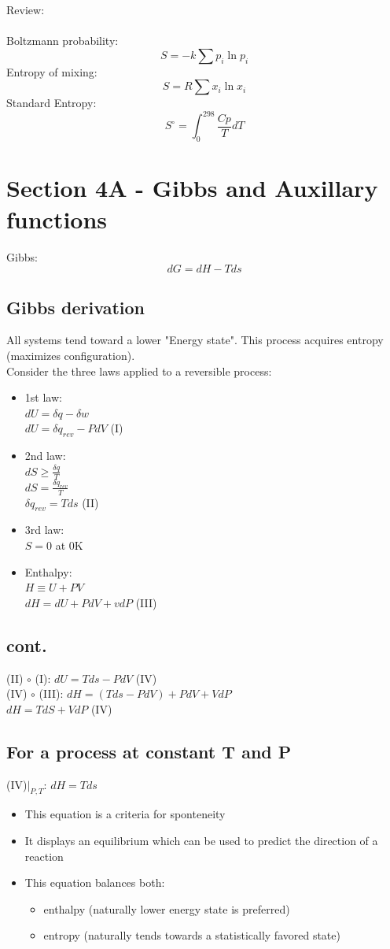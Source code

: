 \documentclass[10pt]{article}
\begin{document}
Review:
\\~\\
Boltzmann probability: $$S = -k \sum p_i \ln p_i$$
Entropy of mixing: $$S = R \sum x_i \ln x_i$$
Standard Entropy: $$S^\circ = \int_{0}^{298}\frac{Cp}{T}dT$$ 

\section{Section 4A - Gibbs and Auxillary functions}
Gibbs: $$dG = dH - Tds$$
\subsection{Gibbs derivation}
All systems tend toward a lower "Energy state". This process acquires entropy (maximizes configuration).
\\
Consider the three laws applied to a reversible process:
\begin{itemize}
    \item 1st law: 
    \\$dU = \delta q - \delta w$ 
    \\ $dU = \delta q_{rev} - PdV$ (I)
    \item 2nd law: 
    \\$dS \ge \frac{\delta q}{T}$
    \\$dS = \frac{\delta q_{rev}}{T}$
    \\$\delta q_{rev} = T ds$ (II)
    \item 3rd law:
    \\$S = 0$ at 0K
    \item Enthalpy:
    \\ $H \equiv U + PV$
    \\$dH = dU + PdV + vdP$ (III)
\end{itemize}
\subsection{cont.}
(II) $\circ$ (I): $dU = Tds - PdV$ (IV)
\\
(IV) $\circ$ (III): $dH = (Tds - PdV) + PdV + VdP$
\\$dH = TdS + VdP$ (IV)

\subsection{For a process at constant T and P}
(IV)$\Big|_{P,T}$: $dH = Tds$
\\
\begin{itemize}
    \item This equation is a criteria for sponteneity
    \item It displays an equilibrium which can be used to predict the direction of a reaction
    \item This equation balances both:
    \begin{itemize}
        \item enthalpy (naturally lower energy state is preferred)
        \item entropy (naturally tends towards a statistically favored state)
    \end{itemize}
\end{itemize}
\end{document}
